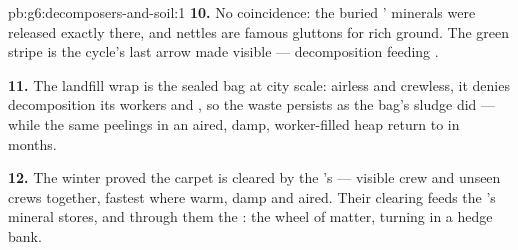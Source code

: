 \begin{solution}{pb:g6:decomposers-and-soil:1}
\textbf{10.} No coincidence: the buried ' minerals
were released exactly there, and nettles are famous
gluttons for rich ground. The green stripe is the cycle's
last arrow made visible --- decomposition feeding
.

\textbf{11.} The landfill wrap is the sealed bag at city
scale: airless and crewless, it denies decomposition its
workers and , so the waste persists as the
bag's sludge did --- while the same peelings in an aired,
damp, worker-filled heap return to  in months.

\textbf{12.} The winter proved the carpet is cleared by
the 's  --- visible crew and unseen crews
together, fastest where warm, damp and aired. Their
clearing feeds the 's mineral stores, and through
them the : the wheel of matter, turning in a
hedge bank.
\end{solution}
